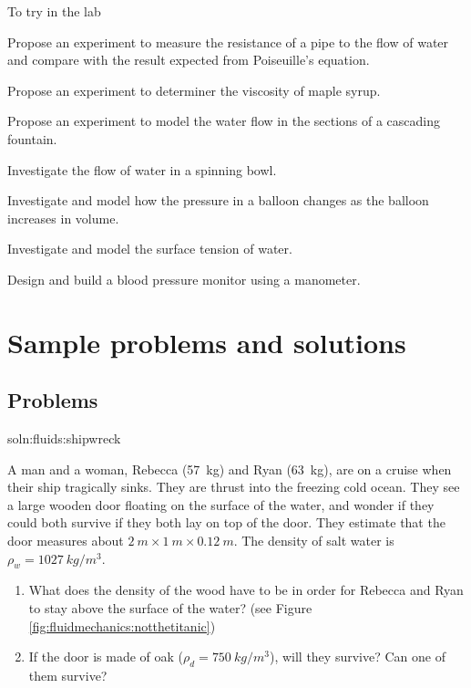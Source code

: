 {{\begin{chapteractivity}{To try in the lab}
{\item Propose an experiment to measure the resistance of a pipe to the flow of water and compare with the result expected from Poiseuille's equation.
\item Propose an experiment to determiner the viscosity of maple syrup.
\item Propose an experiment to model the water flow in the sections of a cascading fountain.
\item Investigate the flow of water in a spinning bowl.
\item Investigate and model how the pressure in a balloon changes as the balloon increases in volume.
\item Investigate and model the surface tension of water.
\item Design and build a blood pressure monitor using a manometer.
}
\end{chapteractivity}

\newpage
\section{Sample problems and solutions}
\subsection{Problems}
\begin{problem}{soln:fluids:shipwreck}{\label{prob:fluids:shipwreck}A man and a woman, Rebecca (\SI{57}{kg}) and Ryan (\SI{63}{kg}), are on a cruise when their ship tragically sinks. They are thrust into the freezing cold ocean. They see a large wooden door floating on the surface of the water, and wonder if they could both survive if they both lay on top of the door. They estimate that the door measures about $\SI{2}{m}\times\SI{1}{m}\times\SI{0.12}{m}$. The density of salt water is $\rho_w=\SI{1027}{kg/m^3}$.
\begin{enumerate}[label=\alph*),topsep=-10pt]
\item What does the density of the wood have to be in order for Rebecca and Ryan to stay above the surface of the water? (see Figure \ref{fig:fluidmechanics:notthetitanic}) 
\item If the door is made of oak ($\rho_d=\SI{750}{kg/m^3}$), will they survive? Can one of them survive?
\end{enumerate}
}
\end{problem}

}}
